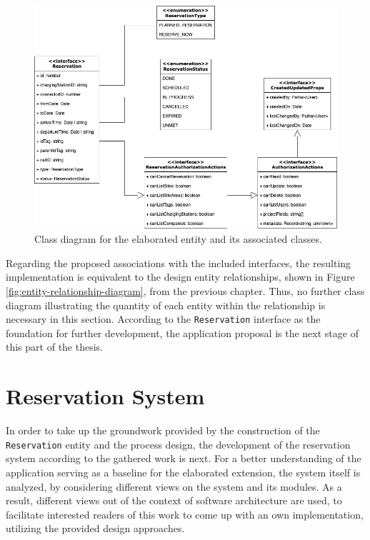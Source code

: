 \begin{figure}[h]
    \centering
    \includegraphics[scale=0.4]{resources/images/main/6_implementation/Reservation.png}
    \caption{Class diagram for the elaborated entity and its associated classes.}
    \label{fig:reservation-class-diagram}
\end{figure}

\noindent Regarding the proposed associations with the included interfaces, the resulting implementation is equivalent to the design entity relationships, shown in Figure \ref{fig:entity-relationship-diagram}, from the previous chapter. Thus, no further class diagram illustrating the quantity of each entity within the relationship is necessary in this section.
According to the \texttt{Reservation} interface as the foundation for further development, the application proposal is the next stage of this part of the thesis. 

\section{Reservation System}
\label{ch:Implementation:sec:Reservation System}

In order to take up the groundwork provided by the construction of the \texttt{Reservation} entity and the process design, the development of the reservation system according to the gathered work is next.
For a better understanding of the application serving as a baseline for the elaborated extension, the system itself is analyzed, by considering different views on the system and its modules.
As a result, different views out of the context of software architecture are used, to facilitate interested readers of this work to come up with an own implementation, utilizing the provided design approaches.

